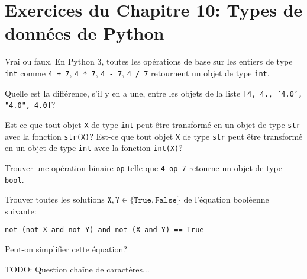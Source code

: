 
\section*{Exercices du Chapitre 10: Types de données de Python}

\begin{exercice}
    Vrai ou faux.
    En Python 3, toutes les opérations de base sur les entiers de type
    \texttt{int} comme 
    \texttt{4 + 7},
    \texttt{4 * 7},
    \texttt{4 - 7},
    \texttt{4 / 7}
    retournent un objet de type \texttt{int}.
\end{exercice}

\begin{exercice}
    Quelle est la différence, s'il y en a une, entre les objets de la liste
    \texttt{[4, 4., '4.0', "4.0", 4.0]}?
\end{exercice}

\begin{exercice}
    Est-ce que tout objet \texttt{X} de type \texttt{int} peut être
    transformé en un objet de type \texttt{str} avec la fonction
    \texttt{str(X)}?
    Est-ce que tout objet \texttt{X} de type \texttt{str} peut être
    transformé en un objet de type \texttt{int} avec la fonction
    \texttt{int(X)}?
\end{exercice}

\begin{exercice}
    Trouver une opération binaire \texttt{op} 
    telle que \texttt{4 op 7} retourne un objet de type \texttt{bool}.
\end{exercice}

\begin{exercice}
    Trouver toutes les solutions $\texttt{X},\texttt{Y}\in\{\texttt{True},
    \texttt{False}\}$ de l'équation booléenne suivante: 
    \begin{center}
	\texttt{not (not X and not Y) and not (X and Y) == True}
    \end{center}
    Peut-on simplifier cette équation?
\end{exercice}


\begin{exercice}
    TODO: Question chaîne de caractères...
\end{exercice}
